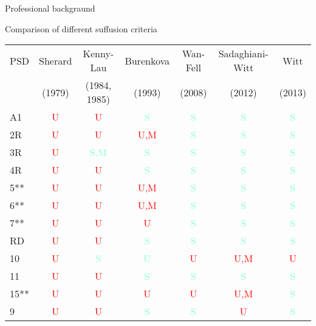 \documentclass[10pt,xcolor=dvipsnames]{beamer}
\begin{document}
{\begin{frame}{Professional backgraund}
\begin{frame}{Comparison of different suffusion criteria}
\begin{table}[b]
{
\scriptsize
\begin{center}
\begin{tabular}{lcccccc}
PSD & Sherard & Kenny-Lau & Burenkova & Wan-Fell & Sadaghiani-Witt & Witt\\
& (1979) & (1984, 1985) & (1993) & (2008) & (2012) & (2013)\\\hline
A1  & \textcolor{red}{U} & \textcolor{red}{U}  & \textcolor{Aquamarine}{S} & \textcolor{Aquamarine}{S} & \textcolor{Aquamarine}{S} & \textcolor{Aquamarine}{S}\\
2R  & \textcolor{red}{U} & \textcolor{red}{U}  & \textcolor{red}{U,M}& \textcolor{Aquamarine}{S} & \textcolor{Aquamarine}{S} & \textcolor{Aquamarine}{S} \\
3R  & \textcolor{red}{U} & \textcolor{Aquamarine}{S,M}& \textcolor{Aquamarine}{S}& \textcolor{Aquamarine}{S} & \textcolor{Aquamarine}{S} & \textcolor{Aquamarine}{S} \\
4R  & \textcolor{red}{U} & \textcolor{red}{U}  & \textcolor{Aquamarine}{S} & \textcolor{Aquamarine}{S} & \textcolor{Aquamarine}{S} & \textcolor{Aquamarine}{S} \\
5** & \textcolor{red}{U} & \textcolor{red}{U}  & \textcolor{red}{U,M}& \textcolor{Aquamarine}{S} & \textcolor{Aquamarine}{S} & \textcolor{Aquamarine}{S} \\
6** & \textcolor{red}{U} & \textcolor{red}{U}  & \textcolor{red}{U,M}& \textcolor{Aquamarine}{S} & \textcolor{Aquamarine}{S} & \textcolor{Aquamarine}{S} \\
7** & \textcolor{red}{U} & \textcolor{red}{U}  & \textcolor{red}{U}  & \textcolor{Aquamarine}{S} & \textcolor{Aquamarine}{S} & \textcolor{Aquamarine}{S} \\
RD  & \textcolor{red}{U} & \textcolor{red}{U}  & \textcolor{Aquamarine}{S} & \textcolor{Aquamarine}{S} & \textcolor{Aquamarine}{S} & \textcolor{Aquamarine}{S} \\
10  & \textcolor{red}{U} & \textcolor{Aquamarine}{S}& \textcolor{Aquamarine}{U} & \textcolor{red}{U}   & \textcolor{red}{U,M}  & \textcolor{red}{U}\\
11  & \textcolor{red}{U} & \textcolor{red}{U}   &  \textcolor{Aquamarine}{S}& \textcolor{Aquamarine}{S}&  \textcolor{Aquamarine}{S} & \textcolor{Aquamarine}{S} \\
15**& \textcolor{red}{U}  & \textcolor{red}{U}  & \textcolor{red}{U}    & \textcolor{red}{U}   & \textcolor{red}{U,M} & \textcolor{Aquamarine}{S}\\
9   & \textcolor{red}{U}  & \textcolor{red}{U}  & \textcolor{Aquamarine}{S} & \textcolor{Aquamarine}{S}& \textcolor{red}{U}  & \textcolor{Aquamarine}{S}\\

\end{tabular}
\end{center}}
\end{table}
\end{frame}
\end{frame}}
\end{document}
